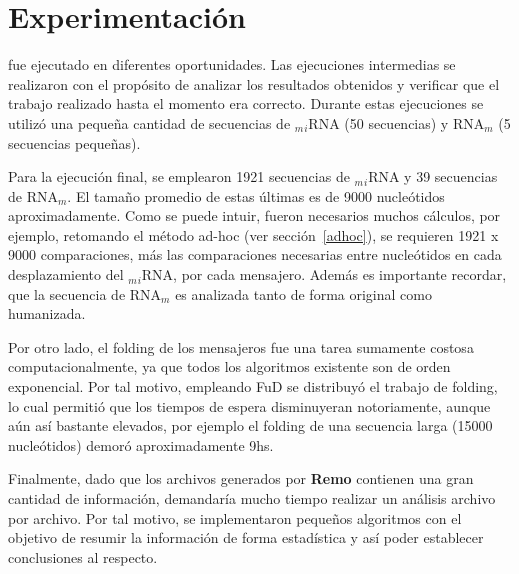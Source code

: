 \section{Experimentación}
\par {} fue ejecutado en diferentes oportunidades. Las ejecuciones intermedias se realizaron con el propósito de analizar los resultados obtenidos y verificar que el trabajo realizado hasta el momento era correcto. Durante estas ejecuciones se utilizó una pequeña cantidad de secuencias de $_m$$_i$RNA (50 secuencias) y RNA$_m$ (5 secuencias pequeñas).

\par Para la ejecución final, se emplearon 1921 secuencias de $_m$$_i$RNA y 39 secuencias de RNA$_m$. El tamaño promedio de estas últimas es de 9000 nucleótidos aproximadamente. Como se puede intuir, fueron necesarios muchos cálculos, por ejemplo, retomando el método ad-hoc (ver sección~\ref{adhoc}), se requieren 1921 x 9000 comparaciones, más las comparaciones necesarias entre nucleótidos en cada desplazamiento del $_m$$_i$RNA, por cada mensajero. Además es importante recordar, que la secuencia de RNA$_m$ es analizada tanto de forma original como humanizada. 

\par Por otro lado, el folding de los mensajeros fue una tarea sumamente costosa computacionalmente, ya que todos los algoritmos existente son de orden exponencial. Por tal motivo, empleando FuD se distribuyó el trabajo de folding, lo cual permitió que los tiempos de espera disminuyeran notoriamente, aunque aún así bastante elevados, por ejemplo el folding de una secuencia larga (15000 nucleótidos) demoró aproximadamente 9hs.

\par Finalmente, dado que los archivos generados por \textbf{Remo} contienen una gran cantidad de información, demandaría mucho tiempo realizar un análisis archivo por archivo. Por tal motivo, se implementaron pequeños algoritmos con el objetivo de resumir la información de forma estadística y así poder establecer conclusiones al respecto.
